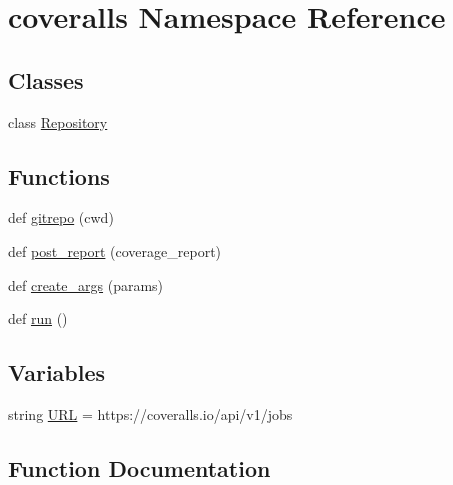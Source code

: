 \hypertarget{namespacecoveralls}{}\section{coveralls Namespace Reference}
\label{namespacecoveralls}
\subsection*{Classes}
\begin{DoxyCompactItemize}
\item 
class \mbox{\hyperlink{classcoveralls_1_1Repository}{Repository}}
\end{DoxyCompactItemize}
\subsection*{Functions}
\begin{DoxyCompactItemize}
\item 
def \mbox{\hyperlink{namespacecoveralls_a992d1fafc3eac31f4ec081f4bdb0236e}{gitrepo}} (cwd)
\item 
def \mbox{\hyperlink{namespacecoveralls_a4637803ef83594232aa5a5c1e6171e87}{post\+\_\+report}} (coverage\+\_\+report)
\item 
def \mbox{\hyperlink{namespacecoveralls_a6d81b110d9426ef48771af9e6d4b85db}{create\+\_\+args}} (params)
\item 
def \mbox{\hyperlink{namespacecoveralls_a6051bbd0ea5955b9aee5d114251bfa1f}{run}} ()
\end{DoxyCompactItemize}
\subsection*{Variables}
\begin{DoxyCompactItemize}
\item 
string \mbox{\hyperlink{namespacecoveralls_af5840fd4c6511f08aec2ba4f6af20206}{U\+RL}} = \textquotesingle{}https\+://coveralls.\+io/api/v1/jobs\textquotesingle{}
\end{DoxyCompactItemize}


\subsection{Function Documentation}
\mbox{\label{namespacecoveralls_a6d81b110d9426ef48771af9e6d4b85db}} 
